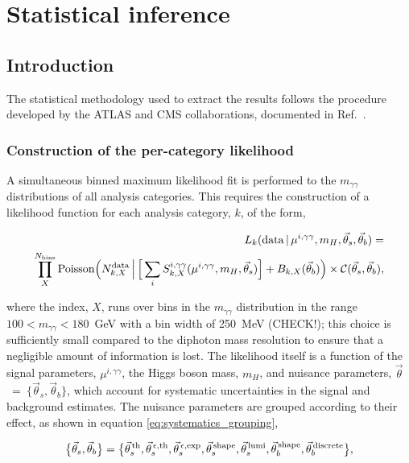\chapter{Statistical inference}
\label{chap:hgg_stats}

\section{Introduction}
The statistical methodology used to extract the results follows the procedure developed by the ATLAS and CMS collaborations, documented in Ref.~\cite{Khachatryan:2014jba}. 

\subsection{Construction of the per-category likelihood}
A simultaneous binned maximum likelihood fit is performed to the $m_{\gamma\gamma}$ distributions of all analysis categories. This requires the construction of a likelihood function for each analysis category, $k$, of the form,

\begin{equation}\label{eq:category_likelihood}
\begin{split}
    L_k({\rm{data}}\,|\,\mu^{i,\gamma\gamma},m_H,\vec{\theta}_s,\vec{\theta}_b) = \\
    \prod^{N_{\rm{bins}}}_{X} {\rm{Poisson}} \Big( N_{k,X}^{\rm{data}} \, \Big| \, \Big[ \sum_{i} S_{k,X}^{i,\gamma\gamma}(\mu^{i,\gamma\gamma},m_H,\vec{\theta}_s)\Big] + B_{k,X}(\vec{\theta}_b) \Big) \times \mathcal{C}(\vec{\theta}_s,\vec{\theta}_b),        
\end{split}
\end{equation}

\noindent
where the index, $X$, runs over bins in the $m_{\gamma\gamma}$ distribution in the range $100<m_{\gamma\gamma}<180$~GeV with a bin width of 250~MeV (CHECK!); this choice is sufficiently small compared to the diphoton mass resolution to ensure that a negligible amount of information is lost. The likelihood itself is a function of the signal parameters, $\mu^{i,\gamma\gamma}$, the Higgs boson mass, $m_H$, and nuisance parameters, $\vec{\theta}$~=~$\{\vec{\theta}_s,\vec{\theta}_b\}$, which account for systematic uncertainties in the signal and background estimates. The nuisance parameters are grouped according to their effect, as shown in equation \ref{eq:systematics_grouping},

\begin{equation}\label{eq:systematics_grouping}
    \big\{\vec{\theta}_s,\vec{\theta}_b\big\} = \big\{ \vec{\theta}^{\,\rm{th}}_{s}, \vec{\theta}^{\,\epsilon,{\rm{th}}}_{s}, \vec{\theta}^{\,\epsilon,{\rm{exp}}}_{s}, \vec{\theta}^{\,\rm{shape}}_{s}, \vec{\theta}^{\,\rm{lumi}}_{s}, \vec{\theta}^{\,\rm{shape}}_{b}, \vec{\theta}^{\,\rm{discrete}}_{b}  \big\},
\end{equation}

